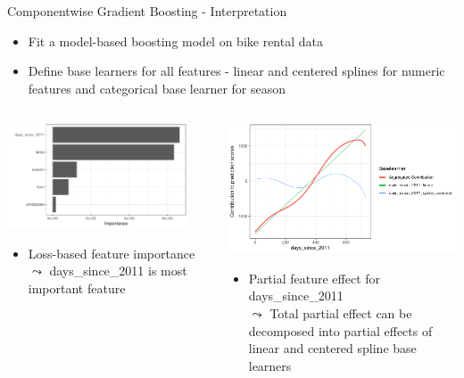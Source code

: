 \documentclass[11pt,compress,t,notes=noshow, aspectratio=169, xcolor=table]{beamer}
\begin{document}
\begin{frame}{Componentwise Gradient Boosting - Interpretation}

\begin{itemize}
    \item Fit a model-based boosting model on bike rental data 
    \item Define base learners for all features - linear and centered splines for numeric features and categorical base learner for season
\end{itemize}
\begin{columns}[T]
\pause
\begin{column}{0.5\textwidth}
 \includegraphics[width = 0.9\textwidth]{figure/compboost_pfi.pdf}
 \begin{itemize}
     \item Loss-based feature importance\\
     $\leadsto$ days\_since\_2011 is most important feature
 \end{itemize}
%
\end{column}
\pause
\begin{column}{0.5\textwidth}  %
  \includegraphics[width = 0.9 \textwidth]{figure/compboost_pfe.pdf}
  \begin{itemize}
      \item Partial feature effect for days\_since\_2011\\
      $\leadsto$ Total partial effect can be decomposed into partial effects of linear and centered spline base learners 
  \end{itemize}
\end{column}
\end{columns}
\end{frame}
\end{document}
